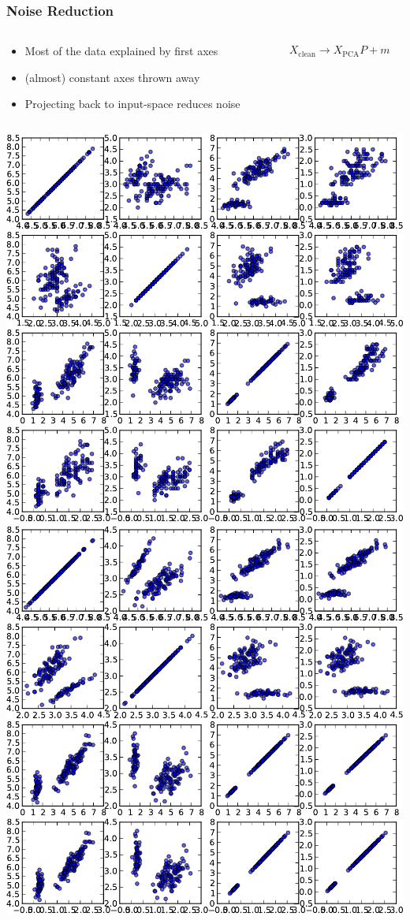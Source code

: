 \begin{frame}[fragile]
  \frametitle{Noise Reduction}
  \begin{columns}
      \begin{column}{.7\linewidth}
          \begin{itemize}
              \item Most of the data explained by first axes
              \item (almost) constant axes thrown away
              \item Projecting back to input-space reduces noise
          \end{itemize}
      \end{column}
      \begin{column}{.3\linewidth}
          \begin{align*}
              X_{\mathrm{clean}} \rightarrow X_{\mathrm{PCA}} P + m 
          \end{align*}
      \end{column}
  \end{columns}
  \begin{center}
    \includegraphics[width=.47\linewidth]{pca-pics/iris-all-nocolor}\hfill%
    \includegraphics[width=.47\linewidth]{pca-pics/iris-bt-nocolor}
  \end{center}
\end{frame}


